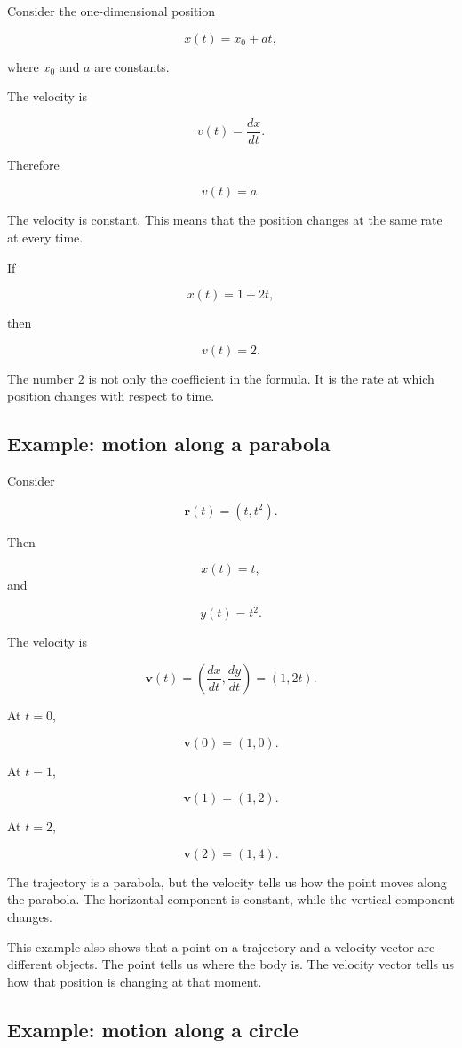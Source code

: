Consider the one-dimensional position

\[
x(t)=x_0+at,
\]

where \(x_0\) and \(a\) are constants.

The velocity is

\[
v(t)=\frac{dx}{dt}.
\]

Therefore

\[
v(t)=a.
\]

The velocity is constant. This means that the position changes at the same rate at every time.

If

\[
x(t)=1+2t,
\]

then

\[
v(t)=2.
\]

The number \(2\) is not only the coefficient in the formula. It is the rate at which position changes with respect to time.

\subsection{Example: motion along a parabola}

Consider

\[
\mathbf{r}(t)=(t,t^2).
\]

Then

\[
x(t)=t,
\]
and

\[
y(t)=t^2.
\]

The velocity is

\[
\mathbf{v}(t)
=
\left(
\frac{dx}{dt},
\frac{dy}{dt}
\right)
=
(1,2t).
\]

At \(t=0\),

\[
\mathbf{v}(0)=(1,0).
\]

At \(t=1\),

\[
\mathbf{v}(1)=(1,2).
\]

At \(t=2\),

\[
\mathbf{v}(2)=(1,4).
\]

The trajectory is a parabola, but the velocity tells us how the point moves along the parabola. The horizontal component is constant, while the vertical component changes.

This example also shows that a point on a trajectory and a velocity vector are different objects. The point tells us where the body is. The velocity vector tells us how that position is changing at that moment.

\subsection{Example: motion along a circle}

